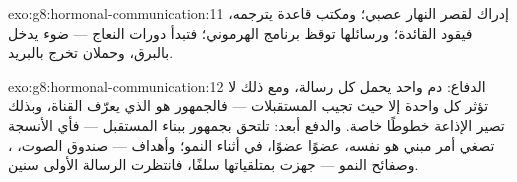 \begin{solution}{exo:g8:hormonal-communication:11}
إدراك  لقصر النهار عصبي؛ ومكتب قاعدة 
يترجمه، فيقود  القائدة؛ ورسائلها توقظ برنامج
 الهرموني؛ فتبدأ دورات النعاج --- ضوء يدخل
بالبرق، وحملان تخرج بالبريد.
\end{solution}

\begin{solution}{exo:g8:hormonal-communication:12}
الدفاع: دم واحد يحمل كل رسالة، ومع ذلك لا تؤثر كل واحدة
إلا حيث تجيب المستقبلات --- فالجمهور هو الذي يعرّف
القناة، وبذلك تصير الإذاعة خطوطًا خاصة. والدفع أبعد:
 تلتحق بجمهور ببناء المستقبل --- فأي الأنسجة تصغي
أمر مبني هو نفسه، عضوًا عضوًا، في أثناء النمو؛ وأهداف
 --- صندوق الصوت، ، وصفائح النمو --- جهزت
بمتلقياتها سلفًا، فانتظرت الرسالة الأولى سنين.
\end{solution}

